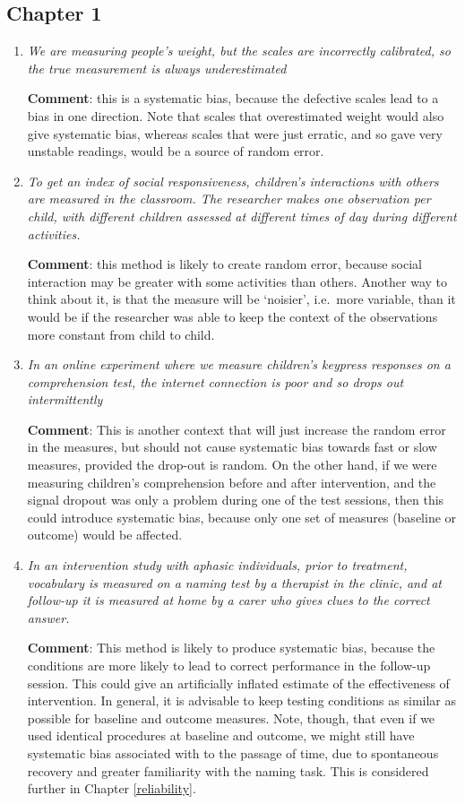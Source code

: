 \documentclass{krantz}
\begin{document}
\hypertarget{chapter-1}{%
\subsection{Chapter 1}\label{chapter-1}}

\begin{enumerate}
\def\labelenumi{\arabic{enumi}.}
\item
  \emph{We are measuring people's weight, but the scales are incorrectly calibrated, so the true measurement is always underestimated}

  \textbf{Comment}: this is a systematic bias, because the defective scales lead to a bias in one direction. Note that scales that overestimated weight would also give systematic bias, whereas scales that were just erratic, and so gave very unstable readings, would be a source of random error.
\item
  \emph{To get an index of social responsiveness, children's interactions with others are measured in the classroom. The researcher makes one observation per child, with different children assessed at different times of day during different activities.}

  \textbf{Comment}: this method is likely to create random error, because social interaction may be greater with some activities than others. Another way to think about it, is that the measure will be `noisier', i.e.~more variable, than it would be if the researcher was able to keep the context of the observations more constant from child to child.
\item
  \emph{In an online experiment where we measure children's keypress responses on a comprehension test, the internet connection is poor and so drops out intermittently}

  \textbf{Comment}: This is another context that will just increase the random error in the measures, but should not cause systematic bias towards fast or slow measures, provided the drop-out is random. On the other hand, if we were measuring children's comprehension before and after intervention, and the signal dropout was only a problem during one of the test sessions, then this could introduce systematic bias, because only one set of measures (baseline or outcome) would be affected.
\item
  \emph{In an intervention study with aphasic individuals, prior to treatment, vocabulary is measured on a naming test by a therapist in the clinic, and at follow-up it is measured at home by a carer who gives clues to the correct answer.}

  \textbf{Comment}: This method is likely to produce systematic bias, because the conditions are more likely to lead to correct performance in the follow-up session. This could give an artificially inflated estimate of the effectiveness of intervention. In general, it is advisable to keep testing conditions as similar as possible for baseline and outcome measures. Note, though, that even if we used identical procedures at baseline and outcome, we might still have systematic bias associated with to the passage of time, due to spontaneous recovery and greater familiarity with the naming task. This is considered further in Chapter \ref{reliability}.
\end{enumerate}
\end{document}
